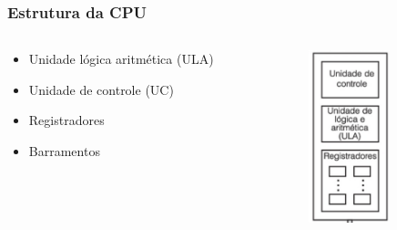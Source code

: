 \documentclass[aspectratio=169,
				xcolor=table]{beamer}
\begin{document}
	\begin{frame}
		\frametitle{Estrutura da CPU}
		\begin{columns}
			\begin{column}{0.55\textwidth}
				\begin{itemize}
					\item Unidade lógica aritmética (ULA)
					\vspace{1em}
					\item Unidade de controle (UC)
					\vspace{1em}
					\item Registradores
					\vspace{1em}
					\item Barramentos

				\end{itemize}
			\end{column}
			\begin{column}{0.3\textwidth}
				\vspace{-0.5cm}
				\begin{figure}
					\centering
					\includegraphics[height=5cm, keepaspectratio]{../figs/cap05/composicao.png} 
				\end{figure}				
			\end{column}
		\end{columns}
	\end{frame}
	
\end{document}
